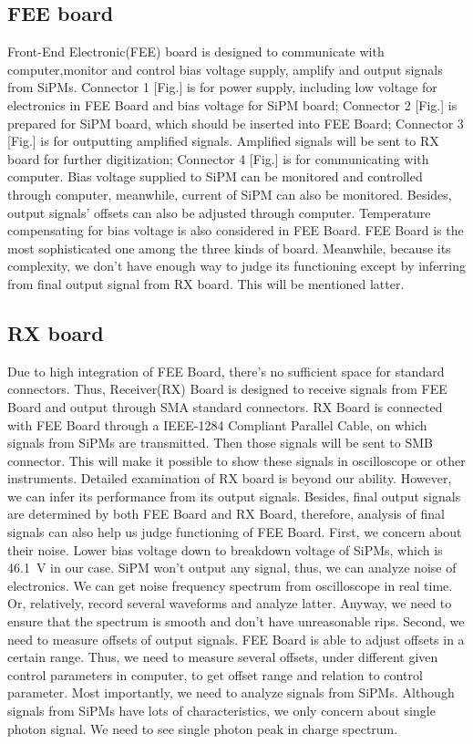 \documentclass[11pt,a4paper]{article}
\begin{document}
\subsection{FEE board}
Front-End Electronic(FEE) board is designed to communicate with computer,monitor and control bias voltage supply, amplify and output signals from SiPMs.
Connector 1 [Fig.] is for power supply, including low voltage for electronics in FEE Board and bias voltage for SiPM board; Connector 2 [Fig.] is prepared for SiPM board, which should be inserted into FEE Board; Connector 3 [Fig.] is for outputting amplified signals. Amplified signals will be sent to RX board for further digitization; Connector 4 [Fig.] is for communicating with computer. 
Bias voltage supplied to SiPM can be monitored and controlled through computer, meanwhile, current of SiPM can also be monitored. Besides, output signals’ offsets can also be adjusted through computer. Temperature compensating for bias voltage is also considered in FEE Board.
FEE Board is the most sophisticated one among the three kinds of board. Meanwhile, because its complexity, we don't have enough way to judge its functioning except by inferring from final output signal from RX board. This will be mentioned latter.

\subsection{RX board}
Due to high integration of FEE Board, there's no sufficient space for standard
connectors. Thus, Receiver(RX) Board is designed to receive signals from FEE Board and output through SMA standard connectors. RX Board is connected with FEE Board through a IEEE-1284 Compliant Parallel Cable, on which signals from SiPMs are transmitted. Then those signals will be sent to SMB connector. This will make it possible to show these signals in oscilloscope or other instruments. Detailed examination of RX board is beyond our ability. However, we can infer its
performance from its output signals. Besides, final output signals are determined by both FEE Board and RX Board, therefore, analysis of final signals can also help us judge functioning of FEE Board.
First, we concern about their noise. Lower bias voltage down to breakdown voltage of SiPMs, which is 46.1~V in our case. SiPM won't output any signal, thus, we can analyze noise of electronics. We can get noise frequency spectrum from oscilloscope in real time. Or, relatively, record several waveforms and analyze latter. Anyway, we need to ensure that the spectrum is smooth and don't have unreasonable rips.
Second, we need to measure offsets of output signals. FEE Board is able to adjust offsets in a certain range. Thus, we need to measure several offsets, under different given control parameters in computer, to get offset range and relation to control parameter.
Most importantly, we need to analyze signals from SiPMs. Although signals from SiPMs have lots of characteristics, we only concern about single photon signal. We need to see single photon peak in charge spectrum.
\end{document}
